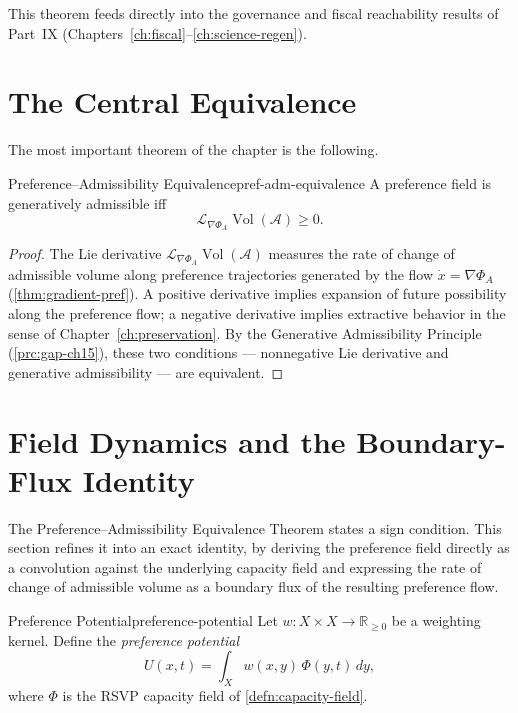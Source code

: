 \documentclass[12pt,twoside,openright]{book}
\newcommand{\adm}{\mathcal{A}}
\newcommand{\Vol}{\operatorname{Vol}}
\begin{document}
This theorem feeds directly into the governance and fiscal
reachability results of Part~IX
(Chapters~\ref{ch:fiscal}--\ref{ch:science-regen}).

\section{The Central Equivalence}
\label{sec:ch22-equivalence}

The most important theorem of the chapter is the following.

\begin{theorem}{Preference--Admissibility Equivalence}{pref-adm-equivalence}
  A preference field is generatively admissible iff
  \[
    \mathcal{L}_{\nabla\Phi_A} \Vol(\adm) \ge 0.
  \]
\end{theorem}

\begin{proof}
  The Lie derivative $\mathcal{L}_{\nabla\Phi_A}\Vol(\adm)$
  measures the rate of change of admissible volume along
  preference trajectories generated by the flow
  $\dot{x} = \nabla\Phi_A$ (\cref{thm:gradient-pref}). A
  positive derivative implies expansion of future
  possibility along the preference flow; a negative
  derivative implies extractive behavior in the sense of
  Chapter~\ref{ch:preservation}. By the Generative
  Admissibility Principle (\cref{prc:gap-ch15}), these two
  conditions — nonnegative Lie derivative and generative
  admissibility — are equivalent.
\end{proof}

\section{Field Dynamics and the Boundary-Flux Identity}
\label{sec:ch22-field-dynamics}

The Preference--Admissibility Equivalence Theorem states a
sign condition. This section refines it into an exact
identity, by deriving the preference field directly as a
convolution against the underlying capacity field and
expressing the rate of change of admissible volume as a
boundary flux of the resulting preference flow.

\begin{definition}{Preference Potential}{preference-potential}
  Let $w:X\times X\to\mathbb{R}_{\ge0}$ be a weighting
  kernel. Define the \emph{preference potential}
  \[
    U(x,t) = \int_X w(x,y)\,\Phi(y,t)\,dy,
  \]
  where $\Phi$ is the RSVP capacity field of
  \cref{defn:capacity-field}.
\end{definition}
\end{document}
